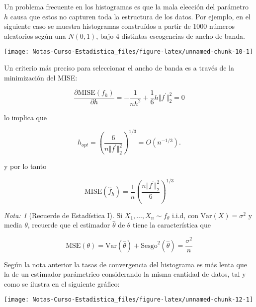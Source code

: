 \documentclass[
  12pt,
]{book}
\theoremstyle{definition}
\theoremstyle{definition}
\theoremstyle{definition}
\theoremstyle{definition}
\theoremstyle{remark}
\newtheorem*{remark}{Nota: }
\begin{document}
Un problema frecuente en los histogramas es que la mala elección del parámetro \(h\) causa que estos no capturen toda la estructura de los datos. Por ejemplo, en el siguiente caso se muestra histogramas construídos a partir de 1000 números aleatorios según una \(N(0,1)\), bajo 4 distintas escogencias de ancho de banda.

\begin{center}\texttt{[image: Notas-Curso-Estadistica\_files/figure-latex/unnamed-chunk-10-1]} \end{center}

Un criterio más preciso para seleccionar el ancho de banda es a través de la minimización del MISE:

\begin{equation*}
\frac{\partial \mathrm{MISE}(f_{h})}{\partial h} = -\frac{1}{nh^2} + \frac{1}{6} h \Vert f^\prime\Vert_{2}^2 = 0
\end{equation*}

lo implica que

\begin{equation*}
h_{opt} = \left(\frac{6}{n\Vert f^\prime\Vert_{2}^2}\right) ^{1/3} = O\left( n^{-1/3} \right).
\end{equation*}

y por lo tanto

\begin{equation*}
\mathrm{MISE}(\hat{f}_{h}) = \frac{1}{n} \left(\frac{n\Vert f^\prime\Vert_{2}^2}{6}\right)  ^{1/3}
\end{equation*}

\begin{remark}[Recuerde de Estadística I]
Si \(X_1, \ldots, X_n \sim f_{\theta}\) i.i.d, con \(\mathrm{Var}(X) = \sigma^2\) y media \(\theta\), recuerde que el estimador \(\hat{\theta}\) de \(\theta\) tiene la característica que

\begin{equation*}
\mathrm{MSE}(\theta) = \mathrm{Var}(\hat{\theta}) +
\mathrm{Sesgo}^2(\hat{\theta}) = \frac{\sigma^2}{n}
\end{equation*}
\end{remark}

Según la nota anterior la tasas de convergencia del histograma es más lenta que la de un estimador parámetrico considerando la misma cantidad de datos, tal y como se ilustra en el siguiente gráfico:

\begin{center}\texttt{[image: Notas-Curso-Estadistica\_files/figure-latex/unnamed-chunk-12-1]} \end{center}
\end{document}
